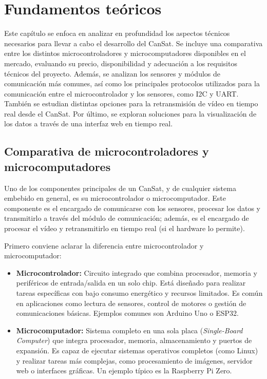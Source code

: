 \chapter{Fundamentos teóricos}
\label{cap:fundamentos_teoricos}
Este capítulo se enfoca en analizar en profundidad los aspectos técnicos necesarios para llevar a cabo el desarrollo del CanSat.
Se incluye una comparativa entre los distintos microcontroladores y microcomputadores disponibles en el mercado, evaluando su precio, disponibilidad y adecuación a los requisitos técnicos del proyecto.
Además, se analizan los sensores y módulos de comunicación más comunes, así como los principales protocolos utilizados para la comunicación entre el microcontrolador y los sensores, como I2C y UART.
También se estudian distintas opciones para la retransmisión de vídeo en tiempo real desde el CanSat.
Por último, se exploran soluciones para la visualización de los datos a través de una interfaz web en tiempo real.


\section{Comparativa de microcontroladores y microcomputadores}
Uno de los componentes principales de un CanSat, y de cualquier sistema embebido en general, es su microcontrolador o microcomputador. Este componente
es el encargado de comunicarse con los sensores, procesar los datos y transmitirlo a través del módulo de comunicación;
además, es el encargado de procesar el vídeo y retransmitirlo en tiempo real (si el hardware lo permite).

Primero conviene aclarar la diferencia entre microcontrolador y microcomputador:
\begin{itemize}
    \item \textbf{Microcontrolador:} Circuito integrado que combina procesador, memoria y periféricos de entrada/salida en un solo chip.
    Está diseñado para realizar tareas específicas con bajo consumo energético y recursos limitados.
    Es común en aplicaciones como lectura de sensores, control de motores o gestión de comunicaciones básicas.
    Ejemplos comunes son Arduino Uno o ESP32.
    \item \textbf{Microcomputador:} Sistema completo en una sola placa (\emph{Single-Board Computer}) que integra procesador, memoria, almacenamiento y puertos de expansión.
    Es capaz de ejecutar sistemas operativos completos (como Linux) y realizar tareas más complejas, como procesamiento de imágenes, servidor web o interfaces gráficas.
    Un ejemplo típico es la Raspberry Pi Zero.
\end{itemize}

